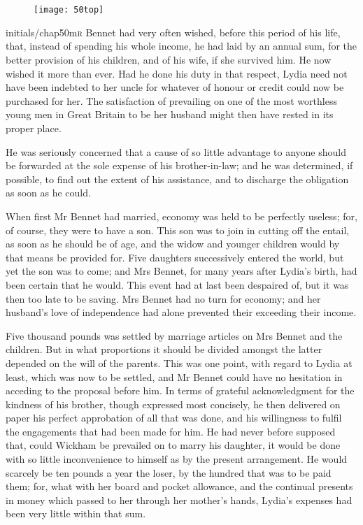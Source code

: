 \chapter[Chapter \thechapter]{}
	
	
\begin{figure}[t!]
\centering
\texttt{[image: 50top]}
\end{figure}


\lettrine[lines=6,image=true]{initials/chap50m}{r} Bennet had very often wished, before this period of his life, that, instead of spending his whole income, he had laid by an annual sum, for the better provision of his children, and of his wife, if she survived him. He now wished it more than ever. Had he done his duty in that respect, Lydia need not have been indebted to her uncle for whatever of honour or credit could now be purchased for her. The satisfaction of prevailing on one of the most worthless young men in Great Britain to be her husband might then have rested in its proper place.

He was seriously concerned that a cause of so little advantage to anyone should be forwarded at the sole expense of his brother-in-law; and he was determined, if possible, to find out the extent of his assistance, and to discharge the obligation as soon as he could.

When first Mr Bennet had married, economy was held to be perfectly useless; for, of course, they were to have a son. This son was to join in cutting off the entail, as soon as he should be of age, and the widow and younger children would by that means be provided for. Five daughters successively entered the world, but yet the son was to come; and Mrs Bennet, for many years after Lydia's birth, had been certain that he would. This event had at last been despaired of, but it was then too late to be saving. Mrs Bennet had no turn for economy; and her husband's love of independence had alone prevented their exceeding their income.

Five thousand pounds was settled by marriage articles on Mrs Bennet and the children. But in what proportions it should be divided amongst the latter depended on the will of the parents. This was one point, with regard to Lydia at least, which was now to be settled, and Mr Bennet could have no hesitation in acceding to the proposal before him. In terms of grateful acknowledgment for the kindness of his brother, though expressed most concisely, he then delivered on paper his perfect approbation of all that was done, and his willingness to fulfil the engagements that had been made for him. He had never before supposed that, could Wickham be prevailed on to marry his daughter, it would be done with so little inconvenience to himself as by the present arrangement. He would scarcely be ten pounds a year the loser, by the hundred that was to be paid them; for, what with her board and pocket allowance, and the continual presents in money which passed to her through her mother's hands, Lydia's expenses had been very little within that sum.

